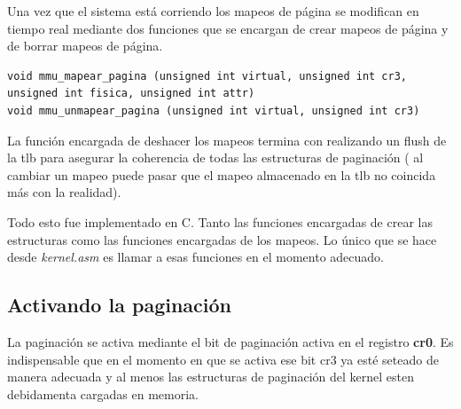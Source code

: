 	Una vez que el sistema está corriendo los mapeos de página se modifican
en tiempo real mediante dos funciones que se encargan de crear
mapeos de página y de borrar mapeos de página.

\begin{verbatim}
void mmu_mapear_pagina (unsigned int virtual, unsigned int cr3, unsigned int fisica, unsigned int attr) 
void mmu_unmapear_pagina (unsigned int virtual, unsigned int cr3) 
\end{verbatim}


	La función encargada de deshacer los mapeos termina con realizando un flush
de la tlb para asegurar la coherencia de todas las estructuras de paginación (
al cambiar un mapeo puede pasar que el mapeo almacenado en la tlb no coincida
más con la realidad).

	Todo esto fue implementado en C. Tanto las funciones
encargadas de crear las estructuras como las funciones encargadas
de los mapeos. Lo único que se hace desde \textit{kernel.asm} es
llamar a esas funciones en el momento adecuado.

\subsection{Activando la paginación}

	La paginación se activa mediante el bit de paginación activa en el
registro \textbf{cr0}. Es indispensable que en el momento en que se
activa ese bit cr3 ya esté seteado de manera adecuada y al menos las
estructuras de paginación del kernel esten debidamenta cargadas en memoria.




